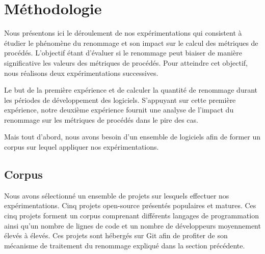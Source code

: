 \section{Méthodologie}
\label{sec:methodologie}

Nous présentons ici le déroulement de nos expérimentations qui consistent à étudier le phénomène du renommage et son impact sur le calcul des métriques de procédés. L’objectif étant d’évaluer si le renommage peut biaiser de manière significative les valeurs des métriques de procédés. Pour atteindre cet objectif, nous réalisons deux expérimentations successives.

Le but de la première expérience et de calculer la quantité de renommage durant les périodes de développement des logiciels. S’appuyant sur cette première expérience, notre deuxième expérience fournit une analyse de l’impact du renommage sur les métriques de procédés dans le pire des cas. 

Mais tout d'abord, nous avons besoin d'un ensemble de logiciels afin de former un corpus sur lequel appliquer nos expérimentations. 

\subsection{Corpus}

Nous avons sélectionné un ensemble de projets sur lesquels effectuer nos expérimentations. Cinq projets open-source présentés  populaires et matures. Ces cinq projets forment un corpus comprenant différents langages de programmation ainsi qu'un nombre de lignes de code et un nombre de développeurs moyennement élevés à élevés.
Ces projets sont hébergés sur Git afin de profiter de son mécanisme de traitement du renommage expliqué dans la section précédente. \\



